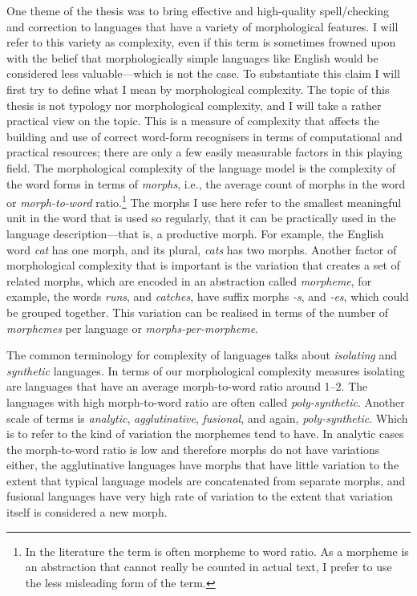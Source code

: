 \documentclass[officiallayout]{unihelcompling}
\begin{document}
One theme of the thesis was to bring effective and high-quality spell\-/checking
and correction to languages that have a variety of morphological features. I
will refer to this variety as complexity, even if this term is sometimes
frowned upon with the belief that morphologically simple languages like English
would be considered less valuable---which is not the case.  To substantiate
this claim I will first try to define what I mean by morphological complexity.
The topic of this thesis is not typology nor morphological complexity, and I
will take a rather practical view on the topic.  This is a measure of
complexity that affects the building and use of correct word-form recognisers
in terms of computational and practical resources; there are only a few easily
measurable factors in this playing field. The morphological complexity of the
language model is the complexity of the word forms in terms of \emph{morphs},
i.e., the average count of morphs in the word or \emph{morph-to-word}
ratio.\footnote{In the literature the term is often morpheme to word ratio. As a
morpheme is an abstraction that cannot really be counted in actual text, I
prefer to use the less misleading form of the term.} The morphs I use here
refer to the smallest meaningful unit in the word that is used so regularly,
that it can be practically used in the language description---that is, a
productive morph. For example, the English word \emph{cat} has one morph, and
its plural, \emph{cats} has two morphs.  Another factor of morphological
complexity that is important is the variation that creates a set of related
morphs, which are encoded in an abstraction called \emph{morpheme}, for
example, the words \emph{runs}, and \emph{catches}, have suffix morphs
\emph{-s}, and \emph{-es}, which could be grouped together. This variation can
be realised in terms of the number of \emph{morphemes} per language or
\emph{morphs-per-morpheme}.

The common terminology for complexity of languages talks about \emph{isolating}
and \emph{synthetic} languages. In terms of our morphological complexity
measures isolating are languages that have an average morph-to-word ratio
around 1--2. The languages with high morph-to-word ratio are often called
\emph{poly-synthetic}. Another scale of terms is \emph{analytic},
\emph{agglutinative}, \emph{fusional}, and again, \emph{poly-synthetic}. Which
is to refer to the kind of variation the morphemes tend to have. In analytic
cases the morph-to-word ratio is low and therefore morphs do not have
variations either, the agglutinative languages have morphs that have little
variation to the extent that typical language models are concatenated from
separate morphs, and fusional languages have very high rate of variation to the
extent that variation itself is considered a new morph. 
\end{document}
